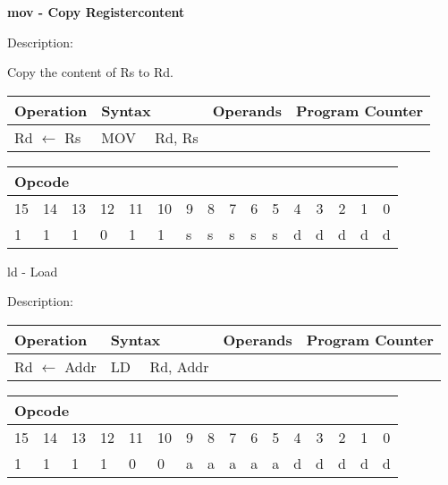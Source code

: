 \documentclass{article}
\begin{document}
\bigskip

\textbf{mov - Copy Registercontent}

Description:

Copy the content of Rs to Rd.

\begin{tabular}{|l|l|l|l|}
\hline
Operation & Syntax & Operands & Program Counter \\ \hline
Rd $\leftarrow $ Rs & MOV \ \ Rd, Rs &  &  \\ \hline
\end{tabular}

\begin{tabular}{|c|c|c|c|c|c|c|c|c|c|c|c|c|c|c|c|}
\hline
\multicolumn{6}{|l|}{Opcode} & \multicolumn{5}{|l|}{} & \multicolumn{5}{|l|}{
} \\ \hline
15 & 14 & 13 & 12 & 11 & 10 & 9 & 8 & 7 & 6 & 5 & 4 & 3 & 2 & 1 & 0 \\ \hline
\multicolumn{1}{|l|}{1} & \multicolumn{1}{|l|}{1} & \multicolumn{1}{|l|}{1}
& \multicolumn{1}{|l|}{0} & \multicolumn{1}{|l|}{1} & \multicolumn{1}{|l|}{1}
& \multicolumn{1}{|l|}{s} & \multicolumn{1}{|l|}{s} & \multicolumn{1}{|l|}{s}
& \multicolumn{1}{|l|}{s} & \multicolumn{1}{|l|}{s} & \multicolumn{1}{|l|}{d}
& \multicolumn{1}{|l|}{d} & \multicolumn{1}{|l|}{d} & \multicolumn{1}{|l|}{d}
& \multicolumn{1}{|l|}{d} \\ \hline
\end{tabular}

\bigskip

ld - Load

Description:

\begin{tabular}{|l|l|l|l|}
\hline
Operation & Syntax & Operands & Program Counter \\ \hline
Rd $\leftarrow $ Addr & LD \ \ Rd, Addr &  &  \\ \hline
\end{tabular}

\begin{tabular}{|c|c|c|c|c|c|c|c|c|c|c|c|c|c|c|c|}
\hline
\multicolumn{6}{|l|}{Opcode} & \multicolumn{5}{|l|}{} & \multicolumn{5}{|l|}{
} \\ \hline
15 & 14 & 13 & 12 & 11 & 10 & 9 & 8 & 7 & 6 & 5 & 4 & 3 & 2 & 1 & 0 \\ \hline
\multicolumn{1}{|l|}{1} & \multicolumn{1}{|l|}{1} & \multicolumn{1}{|l|}{1}
& \multicolumn{1}{|l|}{1} & \multicolumn{1}{|l|}{0} & \multicolumn{1}{|l|}{0}
& \multicolumn{1}{|l|}{a} & \multicolumn{1}{|l|}{a} & \multicolumn{1}{|l|}{a}
& \multicolumn{1}{|l|}{a} & \multicolumn{1}{|l|}{a} & \multicolumn{1}{|l|}{d}
& \multicolumn{1}{|l|}{d} & \multicolumn{1}{|l|}{d} & \multicolumn{1}{|l|}{d}
& \multicolumn{1}{|l|}{d} \\ \hline
\end{tabular}
\end{document}
